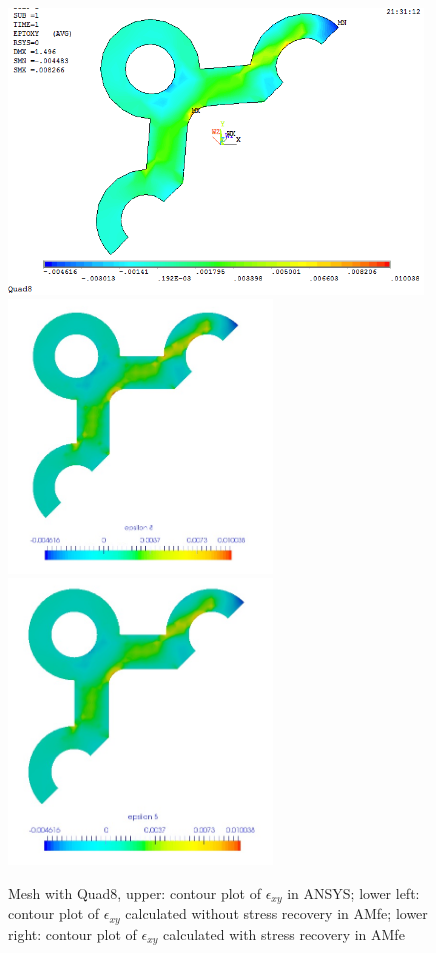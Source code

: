 \begin{figure}[htbp]
	\begin{center}
		\includegraphics[width=11cm,clip]{Quad8_Exy.png} 
		\includegraphics[width=7cm,clip]{Quad8_Exy_PD.png} 			
		\includegraphics[width=7cm,clip]{Quad8_Exy_P.png} 		
		\caption{Mesh with Quad8, upper: contour plot of $\epsilon_{xy}$ in ANSYS; lower left: contour plot of $\epsilon_{xy}$ calculated without stress recovery in AMfe; lower right: contour plot of $\epsilon_{xy}$ calculated with stress recovery in AMfe} \label{fig: Quad8_Exy}
	\end{center}
\end{figure}
\clearpage 

